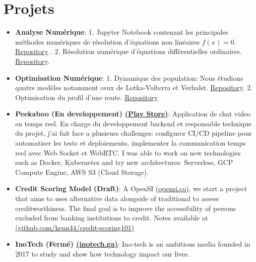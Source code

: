 \documentclass[letterpaper,11pt]{article}
\newcommand{\resumeItem}[2]{
  \item\small{
    \textbf{#1}{: #2 \vspace{-2pt}}
  }
}
\newcommand{\resumeSubItem}[2]{\resumeItem{#1}{#2}\vspace{-4pt}}
\newcommand{\resumeSubHeadingListStart}{\begin{itemize}[leftmargin=*]}
\newcommand{\resumeSubHeadingListEnd}{\end{itemize}}
\begin{document}
\section{Projets}
  \resumeSubHeadingListStart
      \resumeSubItem{Analyse Numérique}
      {1. Jupyter Notebook contenant les principales méthodes
numériques de résolution d'équations non linéaires $f(x)=0$. 
\href{https://github.com/kenn44/root-finding-algorithms}{\underline{Repository}}
. 2. Résolution numérique d'équations différentielles ordinaires. 
\href{https://github.com/kenn44/numerical-ordinary-differential-equations}{
\underline{Repository}}.}
      \resumeSubItem{Optimisation Numérique}
      {1. Dynamique des population: Nous étudions quatre modèles notamment ceux 
de Lotka-Volterra et Verhulst. 
\href{https://github.com/kenn44/modeling-in-population-dynamics}{\underline{
Repository}}. 2. Optimisation du profil d’une route.
\href{https://github.com/kenn44/optimizing-the-profile-of-a-road}{\underline{
Repository}}}
    \resumeSubItem{Peekaboo (En developpement) \href{https://play.google.com/store/apps/details?id=mvp.peekaboo.dev}{(\underline{Play Store})}}
      {Application de chat video en temps reel. En charge du developpement backend et responsable technique du projet, j'ai fait face a plusieurs challenges: configurer CI/CD pipeline pour automatiser les tests et deploiements, implementer la communication temps reel avec Web Socket et WebRTC. I was able to work on new technologies such as Docker, Kubernetes and try new architectures: Serverless, GCP Compute Engine, AWS S3 (Cloud Storage).}
    \resumeSubItem{Credit Scoring Model (Draft)}
      {A OpenSI \href{http://opensi.co/}{(opensi.co)}, we start a project that aims to uses alternative data alongside of traditional to assess creditworthiness. The final goal is to improve the accessibility of persons excluded from banking institutions to credit. Notes available at \href{https://github.com/kenn44/credit-scoring101}{(github.com/kenn44/credit-scoring101)} }
    \resumeSubItem{InoTech (Fermé) \href{https://inotech.ga/}{(inotech.ga)}}
      {Ino-tech is an ambitious media founded in 2017 to study and show how technology impact our lives.}
  \resumeSubHeadingListEnd

%


\end{document}
